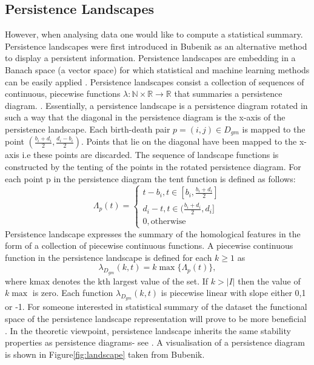 \documentclass{article}
\newcommand{\be}{\begin{equation}}
\newcommand{\ee}{\end{equation}}
\begin{document}
\subsection{Persistence Landscapes}
However, when analysing data one would like to compute a statistical summary. Persistence landscapes were first introduced in Bubenik \cite{bubenik2015statistical} as an alternative method to display a persistent information. Persistence landscapes are embedding in a Banach space (a vector space) for which statistical and machine learning methods can be easily applied \cite{IntroTDADATAscientists} \cite{bubenik2015statistical}. Persistence landscapes consist a collection of sequences of continuous, piecewise functions $\lambda : \mathbb{N} \times \mathbb{R} \to \mathbb{R}$ that summaries a persistence diagram. \cite{IntroTDADATAscientists}. Essentially, a persistence landscape is a persistence diagram rotated in such a way that the diagonal in the persistence diagram is the x-axis of the persistence landscape. Each birth-death pair $p=(i,j) \in D_{gm}$ is mapped to the point $(\frac{b_i+d_i}{2}, \frac{d_i-b_i}{2})$. Points that lie on the diagonal have been mapped to the x-axis i.e these points are discarded. The sequence of landscape functions is constructed by the tenting of the points in the rotated persistence diagram. For each point p in the persistence diagram the tent function is defined as follows:
\be
\Lambda_{p}(t) =  \begin{cases}
  t - b_i, t \in [b_i, \frac{b_i+d_i}{2}]\\    
  d_i - t, t \in (\frac{b_i+d_i}{2}, d_i] \\
  0,  \text{otherwise}
\end{cases}
\ee
Persistence landscape expresses the summary of the homological features in the form of a collection of piecewise continuous functions. A piecewise continuous function in the persistence landscape is defined for each $k\geq 1$ as 
\be
\lambda_{D_{gm}}(k,t) = k\max \{\Lambda_p(t)\},
\ee
where kmax denotes the kth largest value of the set. If $ k > |I|$ then the value of $k\max$ is zero. Each function $\lambda_{D_{gm}}(k,t)$ is piecewise linear with slope either 0,1 or -1. For someone interested in statistical summary of the dataset the functional space of the persistence landscape representation will prove to be more beneficial \cite{bubenik2015statistical}\cite{https://doi.org/10.1002/jcc.23816}. In the theoretic viewpoint, persistence landscape inherits the same stability properties as persistence diagrams- see \cite{EdelTopPersist}\cite{bubenik2015statistical}\cite{HSchenckAlgebraicFound}. A visualisation of a persistence diagram is shown in Figure\ref{fig:landscape} taken from Bubenik. 
\end{document}
